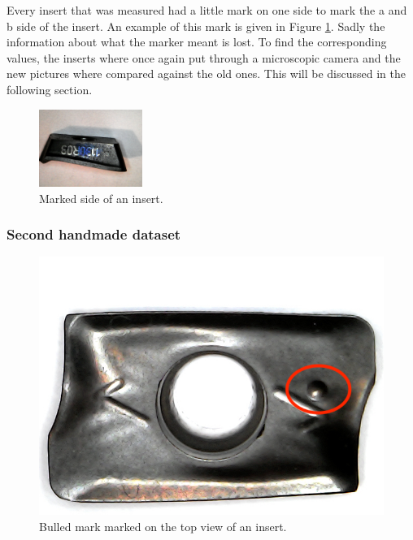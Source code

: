 Every insert that was measured had a little mark on one side to mark the a and b side of the insert. An example of this mark is given in Figure \ref{fig:impl:va:do:mark}. Sadly the information about what the marker meant is lost. To find the corresponding values, the inserts where once again put through a microscopic camera and the new pictures where compared against the old ones. This will be discussed in the following section.

\begin{figure}[hbtp]
\centering
\includegraphics[width=0.3\textwidth, angle=180]{fig/algemeen/plaatjes/plaatje/marked_side.jpg}
\caption{Marked side of an insert.}
\label{fig:impl:va:do:mark}
\end{figure}

			
		\subsubsection{Second handmade dataset}
		\label{sec:impl:ds:shm}
		
		
		
\begin{figure}[hbtp]
			\centering
			\includegraphics[width=.49\textwidth]{fig/algemeen/plaatjes/plaatje/top_view_bullet_marked.jpg}
			\caption{Bulled mark marked on the top view of an insert.}
			\label{fig:impl:va:do:bullet}
		\end{figure}


